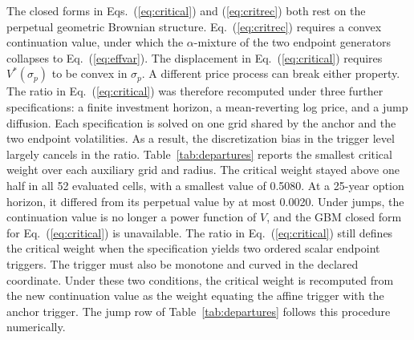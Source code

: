 \documentclass[5p,times,authoryear]{elsarticle}
\theoremstyle{plain}
\begin{document}
The closed forms in Eqs.~(\ref{eq:critical}) and (\ref{eq:critrec}) both rest on the perpetual geometric Brownian structure. Eq.~(\ref{eq:critrec}) requires a convex continuation value, under which the $\alpha$-mixture of the two endpoint generators collapses to Eq.~(\ref{eq:effvar}). The displacement in Eq.~(\ref{eq:critical}) requires $V^{*}(\sigma_p)$ to be convex in $\sigma_p$. A different price process can break either property. The ratio in Eq.~(\ref{eq:critical}) was therefore recomputed under three further specifications: a finite investment horizon, a mean-reverting log price, and a jump diffusion. Each specification is solved on one grid shared by the anchor and the two endpoint volatilities. As a result, the discretization bias in the trigger level largely cancels in the ratio. Table~\ref{tab:departures} reports the smallest critical weight over each auxiliary grid and radius. The critical weight stayed above one half in all 52 evaluated cells, with a smallest value of 0.5080. At a 25-year option horizon, it differed from its perpetual value by at most 0.0020. Under jumps, the continuation value is no longer a power function of $V$, and the GBM closed form for Eq.~(\ref{eq:critical}) is unavailable. The ratio in Eq.~(\ref{eq:critical}) still defines the critical weight when the specification yields two ordered scalar endpoint triggers. The trigger must also be monotone and curved in the declared coordinate. Under these two conditions, the critical weight is recomputed from the new continuation value as the weight equating the affine trigger with the anchor trigger. The jump row of Table~\ref{tab:departures} follows this procedure numerically.
\end{document}
